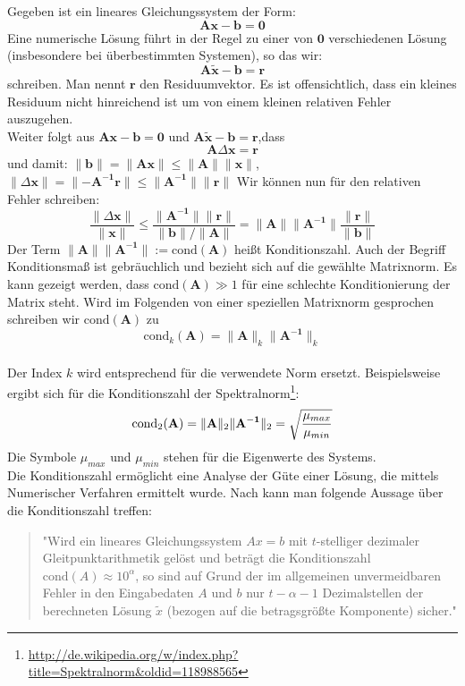 %
Gegeben ist ein lineares Gleichungssystem der Form:
$$ \mathbf{A}\mathbf{x}-\mathbf{b} =\mathbf{0} $$
Eine numerische Lösung führt in der Regel zu einer von $\mathbf{0}$ verschiedenen Lösung (insbesondere bei überbestimmten Systemen), so das wir:
$$ \mathbf{A}\mathbf{\tilde{x}}-\mathbf{b} =\mathbf{r} $$
schreiben. Man nennt $\mathbf{r}$ den Residuumvektor. Es ist offensichtlich, dass ein kleines Residuum nicht hinreichend ist um von einem kleinen relativen Fehler auszugehen.\\
Weiter folgt aus $\mathbf{A}\mathbf{x}-\mathbf{b} =\mathbf{0}$ und $\mathbf{A}\mathbf{\tilde{x}}-\mathbf{b} =\mathbf{r}$,dass 
$$ \mathbf{A}\Delta\mathbf{x}=\mathbf{r}$$
und damit:
$ 
\lVert \mathbf{b} \rVert=\lVert \mathbf{Ax} \rVert \leq \lVert \mathbf{A} \rVert \lVert \mathbf{x} \rVert
$, 
$
\lVert \Delta\mathbf{x} \rVert=\lVert -\mathbf{A^{-1}r} \rVert \leq \lVert \mathbf{A^{-1}} \rVert \lVert \mathbf{r} \rVert
$
Wir können nun für den relativen Fehler schreiben:
$$
\frac{\lVert \Delta\mathbf{x} \rVert}{\lVert \mathbf{x} \rVert} \leq 
\frac{\lVert \mathbf{A^{-1}} \rVert \lVert \mathbf{r} \rVert}{\lVert \mathbf{b} \rVert / \lVert \mathbf{A} \rVert} =
\lVert \mathbf{A} \rVert \lVert \mathbf{A^{-1}} \rVert \frac{\lVert \mathbf{r} \rVert}{\lVert \mathbf{b} \rVert}
$$
Der Term $\lVert \mathbf{A} \rVert \lVert \mathbf{A^{-1}} \rVert := \text{cond}(\mathbf{A})$ heißt Konditionszahl. Auch der Begriff Konditionsmaß ist gebräuchlich und bezieht sich auf die gewählte Matrixnorm.
Es kann gezeigt werden, dass $\text{cond}(\mathbf{A}) \gg 1$  für eine schlechte Konditionierung der Matrix steht. Wird im Folgenden von einer speziellen Matrixnorm gesprochen schreiben wir $\text{cond}(\mathbf{A})$ zu 
$$ 
\text{cond}_k(\mathbf{A}) = \lVert \mathbf{A} \rVert_k \lVert \mathbf{A^{-1}} \rVert_k
$$ \\
Der Index $k$ wird entsprechend für die verwendete Norm ersetzt. Beispielsweise ergibt sich für die Konditionszahl der Spektralnorm\footnote{\url{http://de.wikipedia.org/w/index.php?title=Spektralnorm&oldid=118988565}}:
$$ 
\text{cond}_2(\mathbf{A}) = \lVert \mathbf{A} \rVert_2 \lVert \mathbf{A^{-1}} \rVert_2=
\sqrt{\frac{\mu_{max}}{\mu_{min}}}\\
$$
Die Symbole $\mu_{max}$ und $\mu_{min}$ stehen für die Eigenwerte des Systems.\\

Die Konditionszahl ermöglicht eine Analyse der Güte einer Lösung, die mittels Numerischer Verfahren ermittelt wurde. Nach \cite{hermann2001numerische} kann man folgende Aussage über die Konditionszahl treffen:
%
\begin{quote}
"Wird ein lineares Gleichungssystem $Ax=b$ mit $t$-stelliger dezimaler Gleitpunktarithmetik gelöst und beträgt die Konditionszahl $\text{cond}(A) \approx10^\alpha$, so sind auf Grund der im allgemeinen unvermeidbaren Fehler in den Eingabedaten $A$ und $b$ nur $t-\alpha-1$ Dezimalstellen der berechneten Lösung $\tilde{x}$ (bezogen auf die betragsgrößte Komponente) sicher."
\end{quote}
